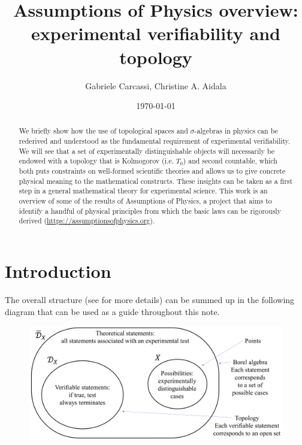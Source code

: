 \documentclass[10pt,twocolumn, nofootinbib]{revtex4-1}
\begin{document}
\title{Assumptions of Physics overview: \\
	experimental verifiability and topology }
\author{Gabriele Carcassi, Christine A. Aidala}

\date{\today}


\begin{abstract}
We briefly show how the use of topological spaces and $\sigma$-algebras in physics can be rederived and understood as the fundamental requirement of experimental verifiability. We will see that a set of experimentally distinguishable objects will necessarily be endowed with a topology that is Kolmogorov (i.e. $T_0$) and second countable, which both puts constraints on well-formed scientific theories and allows us to give concrete physical meaning to the mathematical constructs. These insights can be taken as a first step in a general mathematical theory for experimental science. This work is an overview of some of the results of Assumptions of Physics, a project that aims to identify a handful of physical principles from which the basic laws can be rigorously derived  (\url{https://assumptionsofphysics.org}).
\end{abstract}

\maketitle

\section{Introduction}

The overall structure (see \cite{AoPBook} for more details) can be summed up in the following diagram that can be used as a guide throughout this note.

\begin{figure}[h]
	\includegraphics[width=\columnwidth]{Diagram.png}
\end{figure}
\end{document}

